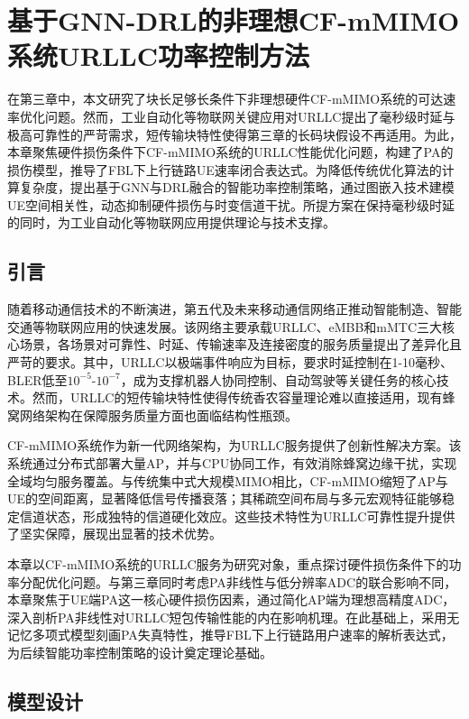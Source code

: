 \chapter{基于GNN-DRL的非理想CF-mMIMO系统URLLC功率控制方法}\label{chap:MIMOLP}

在第三章中，本文研究了块长足够长条件下非理想硬件CF-mMIMO系统的可达速率优化问题。然而，工业自动化等物联网关键应用对URLLC提出了毫秒级时延与极高可靠性的严苛需求，短传输块特性使得第三章的长码块假设不再适用。为此，本章聚焦硬件损伤条件下CF-mMIMO系统的URLLC性能优化问题，构建了PA的损伤模型，推导了FBL下上行链路UE速率闭合表达式。为降低传统优化算法的计算复杂度，提出基于GNN与DRL融合的智能功率控制策略，通过图嵌入技术建模UE空间相关性，动态抑制硬件损伤与时变信道干扰。所提方案在保持毫秒级时延的同时，为工业自动化等物联网应用提供理论与技术支撑。

\section{引言}

随着移动通信技术的不断演进，第五代及未来移动通信网络正推动智能制造、智能交通等物联网应用的快速发展。该网络主要承载URLLC、eMBB和mMTC三大核心场景，各场景对可靠性、时延、传输速率及连接密度的服务质量提出了差异化且严苛的要求。其中，URLLC以极端事件响应为目标，要求时延控制在1-10毫秒、BLER低至$10^{-5}$-$10^{-7}$，成为支撑机器人协同控制、自动驾驶等关键任务的核心技术。然而，URLLC的短传输块特性使得传统香农容量理论难以直接适用，现有蜂窝网络架构在保障服务质量方面也面临结构性瓶颈。

CF-mMIMO系统作为新一代网络架构，为URLLC服务提供了创新性解决方案。该系统通过分布式部署大量AP，并与CPU协同工作，有效消除蜂窝边缘干扰，实现全域均匀服务覆盖。与传统集中式大规模MIMO相比，CF-mMIMO缩短了AP与UE的空间距离，显著降低信号传播衰落；其稀疏空间布局与多元宏观特征能够稳定信道状态，形成独特的信道硬化效应。这些技术特性为URLLC可靠性提升提供了坚实保障，展现出显著的技术优势。

本章以CF-mMIMO系统的URLLC服务为研究对象，重点探讨硬件损伤条件下的功率分配优化问题。与第三章同时考虑PA非线性与低分辨率ADC的联合影响不同，本章聚焦于UE端PA这一核心硬件损伤因素，通过简化AP端为理想高精度ADC，深入剖析PA非线性对URLLC短包传输性能的内在影响机理。在此基础上，采用无记忆多项式模型刻画PA失真特性，推导FBL下上行链路用户速率的解析表达式，为后续智能功率控制策略的设计奠定理论基础。

\section{模型设计}

